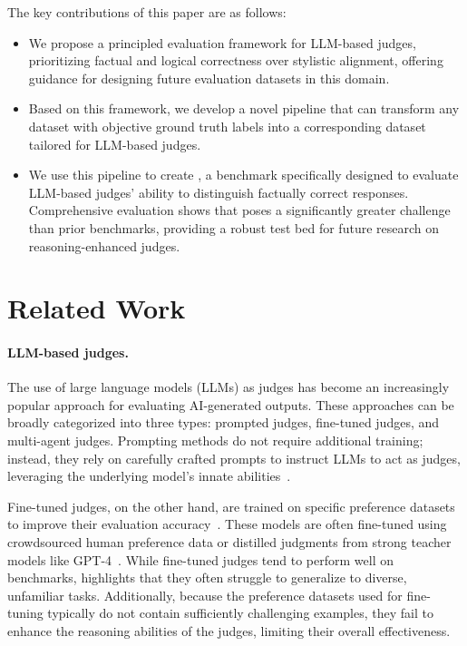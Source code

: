 \documentclass{article} %
\begin{document}
The key contributions of this paper are as follows: 
\begin{itemize} 
    \item We propose a principled evaluation framework for LLM-based judges, prioritizing factual and logical correctness over stylistic alignment, offering guidance for designing future evaluation datasets in this domain.
    \item Based on this framework, we develop a novel pipeline that can transform any dataset with objective ground truth labels into a corresponding dataset tailored for LLM-based judges. 
    \item We use this pipeline to create \sys, a benchmark specifically designed to evaluate LLM-based judges' ability to distinguish factually correct responses. Comprehensive evaluation shows that \sys poses a significantly greater challenge than prior benchmarks, providing a robust test bed for future research on reasoning-enhanced judges.
\end{itemize}

\section{Related Work}

\paragraph{LLM-based judges.} The use of large language models (LLMs) as judges has become an increasingly popular approach for evaluating AI-generated outputs. These approaches can be broadly categorized into three types: prompted judges, fine-tuned judges, and multi-agent judges. Prompting methods do not require additional training; instead, they rely on carefully crafted prompts to instruct LLMs to act as judges, leveraging the underlying model's innate abilities~\citep{dubois2024alpacafarm, zheng2024judging, li2024arenahard}.

Fine-tuned judges, on the other hand, are trained on specific preference datasets to improve their evaluation accuracy~\citep{wang2023pandalm, kim2023prometheus, kim2024prometheus2, li2023autoj, zhu2023judgelm}. These models are often fine-tuned using crowdsourced human preference data or distilled judgments from strong teacher models like GPT-4~\citep{openai2024gpt4technicalreport}. While fine-tuned judges tend to perform well on benchmarks, \cite{huang2024limitations} highlights that they often struggle to generalize to diverse, unfamiliar tasks. Additionally, because the preference datasets used for fine-tuning typically do not contain sufficiently challenging examples, they fail to enhance the reasoning abilities of the judges, limiting their overall effectiveness.
\end{document}
